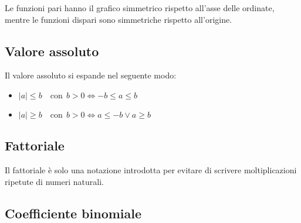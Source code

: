 Le funzioni pari hanno il grafico simmetrico rispetto all'asse delle ordinate, mentre le funzioni dispari sono simmetriche rispetto all'origine.

\subsection{Valore assoluto}


Il valore assoluto si espande nel seguente modo:
\begin{itemize}
    \item $|a| \leq b \quad \mathrm{con}\;\, b > 0 \iff -b \leq a \leq b$
    \item $|a| \geq b \quad \mathrm{con}\;\, b > 0 \iff a \leq -b \lor a \geq b$
\end{itemize}

\subsection{Fattoriale}
Il fattoriale è solo una notazione introdotta per evitare di scrivere moltiplicazioni ripetute di numeri naturali.

\subsection{Coefficiente binomiale} \label{coefficiente-binomiale}

